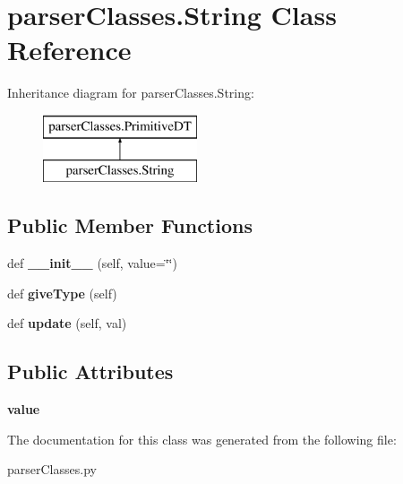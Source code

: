 \hypertarget{classparser_classes_1_1_string}{}\section{parser\+Classes.\+String Class Reference}
\label{classparser_classes_1_1_string}
Inheritance diagram for parser\+Classes.\+String\+:\begin{figure}[H]
\begin{center}
\leavevmode
\includegraphics[height=2.000000cm]{classparser_classes_1_1_string}
\end{center}
\end{figure}
\subsection*{Public Member Functions}
\begin{DoxyCompactItemize}
\item 
def {\bfseries \+\_\+\+\_\+init\+\_\+\+\_\+} (self, value=\textquotesingle{}\char`\"{}\char`\"{}\textquotesingle{})\hypertarget{classparser_classes_1_1_string_a4c4e2819010c0c58d4f628f3584fdd69}{}\label{classparser_classes_1_1_string_a4c4e2819010c0c58d4f628f3584fdd69}

\item 
def {\bfseries give\+Type} (self)\hypertarget{classparser_classes_1_1_string_a7a00e512a68ea3f88b25bcb060382393}{}\label{classparser_classes_1_1_string_a7a00e512a68ea3f88b25bcb060382393}

\item 
def {\bfseries update} (self, val)\hypertarget{classparser_classes_1_1_string_a11c7326188baeb6a6e43a06d6f94d055}{}\label{classparser_classes_1_1_string_a11c7326188baeb6a6e43a06d6f94d055}

\end{DoxyCompactItemize}
\subsection*{Public Attributes}
\begin{DoxyCompactItemize}
\item 
{\bfseries value}\hypertarget{classparser_classes_1_1_string_a04fcb7b360e30d106a7879b0964274b3}{}\label{classparser_classes_1_1_string_a04fcb7b360e30d106a7879b0964274b3}

\end{DoxyCompactItemize}


The documentation for this class was generated from the following file\+:\begin{DoxyCompactItemize}
\item 
parser\+Classes.\+py\end{DoxyCompactItemize}
